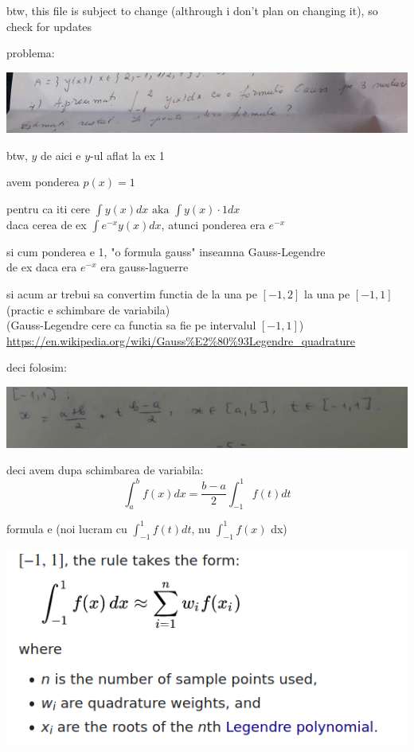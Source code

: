 \documentclass[11pt]{article}
\date{\today}
\title{}
\begin{document}
btw, this file is subject to change (althrough i don't plan on changing it), so check for updates
\medskip

problema:
\begin{center}
\includegraphics[width=\linewidth]{./problema.png}
\end{center}

btw, \(y\) de aici e \(y\)-ul aflat la ex 1
\medskip

avem ponderea \(p(x) = 1\)
\medskip

pentru ca iti cere \(\displaystyle \int y(x) dx \text{ aka } \int y(x) \cdot 1 dx\)\\
daca cerea de ex \(\displaystyle \int e^{-x} y(x) dx\), atunci ponderea era \(e^{-x}\)
\medskip

si cum ponderea e 1, "o formula gauss" inseamna Gauss-Legendre\\
de ex daca era \(e^{-x}\) era gauss-laguerre
\medskip

si acum ar trebui sa convertim functia de la una pe \([-1, 2]\) la una pe \([-1, 1]\) (practic e schimbare de variabila)\\
(Gauss-Legendre cere ca functia sa fie pe intervalul \([-1, 1]\))\\
\url{https://en.wikipedia.org/wiki/Gauss\%E2\%80\%93Legendre\_quadrature}
\medskip

deci folosim:
\begin{center}
\includegraphics[width=\linewidth]{./a,b to -1,1.png}
\end{center}

deci avem dupa schimbarea de variabila:
\[ \int_a^b f(x) dx = \frac{b-a}{2} \int_{-1}^1 f(t) dt \]

formula e (noi lucram cu \(\int_{-1}^1 f(t) dt\), nu \(\int_{-1}^1 f(x)\) dx)
\begin{center}
\includegraphics[width=.6\linewidth]{./formula.png}
\end{center}
\end{document}
